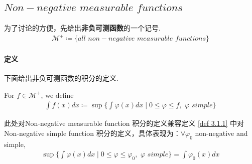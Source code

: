 \newpage
\subsection{$Non-negative \,\, measurable \,\, functions$}
	为了讨论的方便，先给出\textbf{非负可测函数}的一个记号.
	\begin{align}
		\mathcal{M}^{+} \coloneqq \{ all \,\, non-negative \,\, measurable \,\, functions \}
	\end{align}

\vspace{2em}
\paragraph{定义}
	下面给出非负可测函数的积分的定义.
	\begin{defn}\label{def 3.1.3}
		For $f \in \mathcal{M}^{+}$, we define
		\begin{align}
			\int{f(x) dx} \coloneqq \sup{\{ \int{\varphi(x) dx} \mid 0 \leq \varphi \leq f , \,\, \varphi \,\, simple \}}
		\end{align}
		
		\begin{rmk}
			此处对Non-negative measurable function 积分的定义兼容定义 \ref{def 3.1.1} 中对Non-negative simple function 积分的定义，具体表现为：$\forall \varphi_0$ non-negative and simple,
			\begin{align}
				\sup{\{ \int{\varphi(x) dx} \mid 0 \leq \varphi \leq \varphi_0 , \,\, \varphi \,\, simple \}} = \int{\varphi_0 (x) dx}
			\end{align}
		\end{rmk}
	\end{defn}

\vspace{2em}
